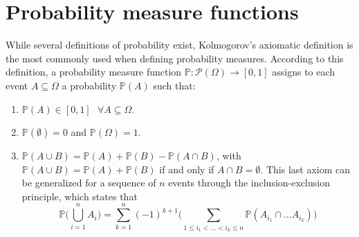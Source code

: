 \documentclass{report}
\begin{document}
\section{Probability measure functions}
While several definitions of probability exist, Kolmogorov's axiomatic definition is the most commonly used when defining probability measures. \newline
According to this definition, a probability measure function $\displaystyle \mathbb{P}: \mathcal{P}(\Omega) \to [0, 1]$ assigns to each event $\displaystyle A \subseteq \Omega$ a probability $\displaystyle \mathbb{P}(A)$ such that:
\begin{enumerate}
    \item $\displaystyle \mathbb{P}(A) \in [0, 1] \text{ } \forall A \subseteq \Omega$.
    \item $\displaystyle \mathbb{P}(\emptyset) = 0$ and $\displaystyle \mathbb{P}(\Omega) = 1$.
    \item $\displaystyle \mathbb{P}(A \cup B) = \mathbb{P}(A) + \mathbb{P}(B) - \mathbb{P}(A \cap B)$, with $\displaystyle \mathbb{P}(A \cup B) = \mathbb{P}(A) + \mathbb{P}(B)$ if and only if $\displaystyle A \cap B = \emptyset$. \newline
    This last axiom can be generalized for a sequence of $\displaystyle n$ events through the inclusion-exclusion principle, which states that
    \[\mathbb{P}\Bigg(\bigcup_{i = 1}^n A_i\Bigg) = \sum_{k = 1}^n (-1)^{k + 1}\Bigg(\sum_{1 \leq i_1 < \dots < i_k \leq n} \mathbb{P}(A_{i_1} \cap \dots A_{i_k})\Bigg)\]
\end{enumerate}
\end{document}
